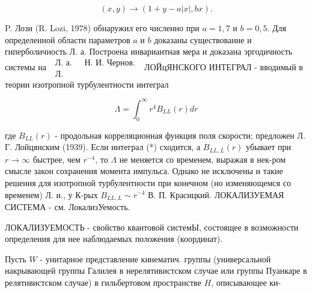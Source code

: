 \documentclass[10pt]{article}
\begin{document}
\[

(x, y) \rightarrow(1+y-a|x|, b x) .

\]



P. Лози (R. Lozi, 1978) обнаружил его численно при $a=1,7$ и $b=0,5$. Для определенной области параметров $a$ и $b$ доказаны существование и гиперболичность Л. а. Построена инвариантная мера и доказана эргодичность системы на $\begin{array}{ll}\text { Л. а. } & \text { Н. И. Чернов. } \\ \text { Л. }\end{array}$ ЛОЙцЯНСКОГО ИНТЕГРАЛ - вводимый в теории изотропной турбулентности интеграл



\[

\Lambda=\int_{0}^{\infty} r^{4} B_{L L}(r) d r

\]



где $B_{L L}(r)$ - продольная корреляционная функция поля скорости; предложен Л. Г. Лойцянским (1939). Если интеграл (*) сходится, а $B_{L L, L}(r)$ убывает при $r \rightarrow \infty$ быстрее, чем $r^{-4}$, то $\Lambda$ не меняется со временем, выражая в нек-ром смысле закон сохранения момента импульса. Однако не исключены и такие решения для изотропной турбулентности при конечном (но изменяющемся со временем) Л. и., у К-рых $B_{L L, L} \sim r^{-4}$ В. П. Красицкий. ЛОКАЛИЗУЕМАЯ СИСТЕМА - см. ЛокализУемость.



ЛОКАЛИЗУЕМОСТЬ - свойство квантовой системЫ, состоящее в возможности определения для нее наблюдаемых положения (координат).



Пусть $W$ - унитарное представление кинематич. группы (универсальной накрывающей группы Галилея в нерелятивистском случае или группы Пуанкаре в релятивистском случае) в гильбертовом пространстве $H$, описывающее ки-
\end{document}
